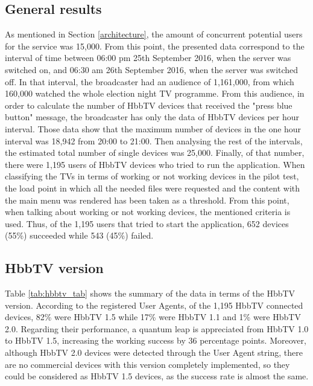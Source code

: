 \subsection{General results} \label{generalres}
As mentioned in Section \ref{architecture}, the amount of concurrent potential users for the service was 15,000. From this point, the presented data correspond to the interval of time between 06:00 pm 25th September 2016, when the server was switched on, and 06:30 am 26th September 2016, when the server was switched off. In that interval, the broadcaster had an audience of 1,161,000, from which 160,000 watched the whole election night TV programme. From this audience, in order to calculate the number of HbbTV devices that received the "press blue button" message, the broadcaster has only the data of HbbTV devices per hour interval. Those data show that the maximum number of devices in the one hour interval was 18,942 from 20:00 to 21:00. Then analysing the rest of the intervals, the estimated total number of single devices was 25,000. Finally, of that number, there were 1,195 users of HbbTV devices who tried to run the application. When classifying the TVs in terms of working or not working devices in the pilot test, the load point in which all the needed files were requested and the content with the main menu was rendered has been taken as a threshold. From this point, when talking about working or not working devices, the mentioned criteria is used. Thus, of the 1,195 users that tried to start the application, 652 devices (55\%) succeeded while 543 (45\%) failed.  

\subsection{HbbTV version}\label{hbbtvres}
Table \ref{tab:hbbtv_tab} shows the summary of the data in terms of the HbbTV version. According to the registered User Agents, of the 1,195 HbbTV connected devices, 82\% were HbbTV 1.5 while 17\% were HbbTV 1.1 and 1\% were HbbTV 2.0. Regarding their performance, a quantum leap is appreciated from HbbTV 1.0 to HbbTV 1.5, increasing the working success by 36 percentage points. Moreover, although HbbTV 2.0 devices were detected through the User Agent string, there are no commercial devices with this version completely implemented, so they could be considered as HbbTV 1.5 devices, as the success rate is almost the same.

